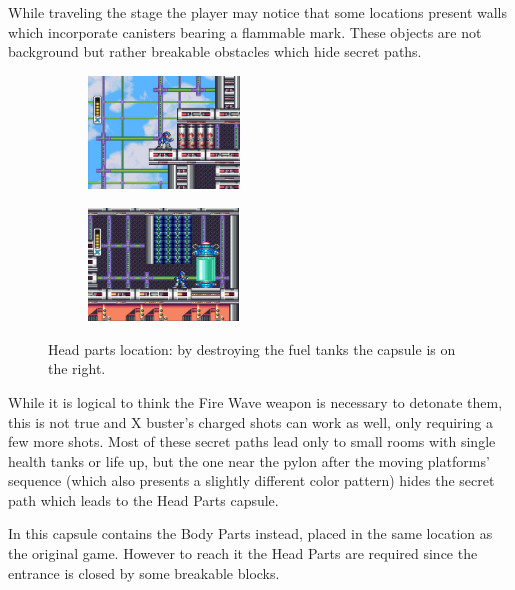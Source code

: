 While traveling the stage the player may notice that some locations present walls which incorporate canisters bearing a flammable mark. These objects are not background but rather breakable obstacles which hide secret paths. 
\begin{figure}[htp]
	\centering
	\begin{subfigure}{0.4\linewidth}
		\centering
		\includegraphics[height=3cm]{figures/X1/Storm_eagle/Storm_armor_1.jpg}
		\caption{}
	\end{subfigure}
	\begin{subfigure}{0.4\linewidth}
		\centering
		\includegraphics[height=3cm]{figures/X1/Storm_eagle/Storm_armor_2.jpg}
		\caption{}
	\end{subfigure}
	\caption{Head parts location: by destroying the fuel tanks the capsule is on the right.}
\end{figure}
While it is logical to think the Fire Wave weapon is necessary to detonate them, this is not true and X buster's charged shots can work as well, only requiring a few more shots. Most of these secret paths lead only to small rooms with single health tanks or life up, but the one near the pylon after the moving platforms' sequence (which also presents a slightly different color pattern) hides the  secret path which leads to the Head Parts capsule. 

In \mhx this capsule contains the Body Parts instead, placed in the same location as the original game. However to reach it the Head Parts are required since the entrance is closed by some breakable blocks.

